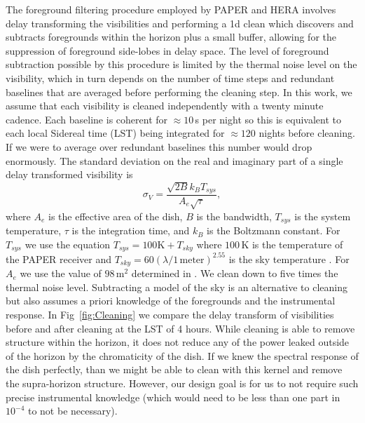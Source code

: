 \documentclass[twocolumn]{emulateapj}
\begin{document}
The foreground filtering procedure employed by PAPER and HERA involves delay transforming the visibilities and performing a 1d clean \citep{Parsons:2009,Parsons:2012} which discovers and subtracts foregrounds within the horizon plus a small buffer, allowing for the suppression of foreground side-lobes in delay space. The level of foreground subtraction possible by this procedure is limited by the thermal noise level on the visibility, which in turn depends on the number of time steps and redundant baselines that are averaged before performing the cleaning step. In this work, we assume that each visibility is cleaned independently with a twenty minute cadence. Each baseline is coherent for $\approx 10$\,s per night so this is equivalent to each local Sidereal time (LST) being integrated for $\approx 120$ nights before cleaning. If we were to average over redundant baselines this number would drop enormously. The standard deviation on the real and imaginary part of a single delay transformed visibility is \citep{Morales:2004}
\begin{equation}
\sigma_V = \frac{\sqrt{2 B} k_B T_{sys}}{A_e \sqrt{\tau}},
\end{equation}
where $A_e$ is the effective area of the dish, $B$ is the bandwidth, $T_{sys}$ is the system temperature, $\tau$ is the integration time, and $k_B$ is the Boltzmann constant. For $T_{sys}$ we use the equation $T_{sys} = 100\text{K} + T_{sky}$ where $100$\,K is the temperature of the PAPER receiver and $T_{sky} = 60 (\lambda/1\,\text{meter} )^{2.55}$ is the sky temperature \citep{Fixsen:2011}. For $A_e$ we use the value of $98$\,m$^2$ determined in \citet{Neben:2016}. We clean down to five times the thermal noise level. Subtracting a model of the sky is an alternative to cleaning but also assumes a priori knowledge of the foregrounds and the instrumental response. In Fig~\ref{fig:Cleaning} we compare the delay transform of visibilities before and after cleaning at the LST of 4 hours. While cleaning is able to remove structure within the horizon, it does not reduce any of the power leaked outside of the horizon by the chromaticity of the dish. If we knew the spectral response of the dish perfectly, than we might be able to clean with this kernel and remove the supra-horizon structure. However, our design goal is for us to not require such precise instrumental knowledge (which would need to be less than one part in $10^{-4}$ to not be necessary). 
\end{document}
